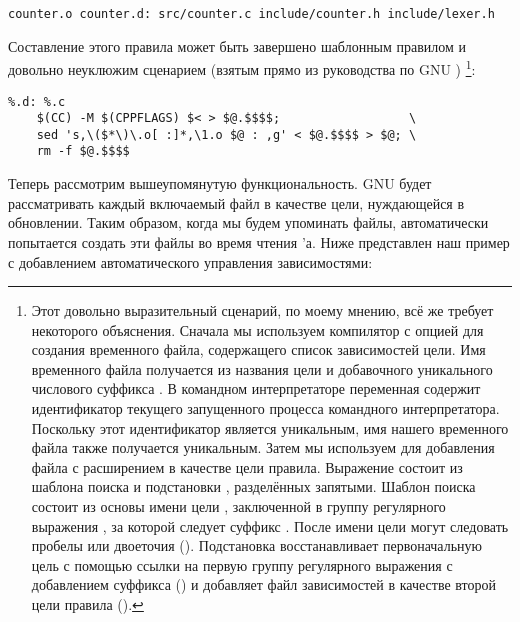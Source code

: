 {\footnotesize
\begin{verbatim}
counter.o counter.d: src/counter.c include/counter.h include/lexer.h
\end{verbatim}
}

Составление этого правила может быть завершено шаблонным правилом и
довольно неуклюжим сценарием (взятым прямо из руководства по GNU
\GNUmake{}) \footnote{Этот довольно выразительный сценарий, по моему
мнению, всё же требует некоторого объяснения. Сначала мы используем
компилятор \Clang{} с опцией  для создания временного
файла, содержащего список зависимостей цели. Имя временного файла
получается из названия цели  и добавочного уникального
числового суффикса . В командном
интерпретаторе  переменная \command{\${}\${}} содержит
идентификатор текущего запущенного процесса командного интерпретатора.
Поскольку этот идентификатор является уникальным, имя нашего
временного файла также получается уникальным.  Затем мы используем
 для добавления файла с расширением  в
качестве цели правила. Выражение  состоит из шаблона
поиска
 и подстановки , разделённых
запятыми. Шаблон поиска состоит из основы имени цели \command{\${}*},
заключенной в группу регулярного выражения
\command{\textbackslash{}(\textbackslash{})}, за которой следует
суффикс . После имени цели могут следовать пробелы или
двоеточия (\command{[ :]*}). Подстановка восстанавливает
первоначальную цель с помощью ссылки на первую группу регулярного
выражения с добавлением суффикса () и
добавляет файл зависимостей в качестве второй цели правила
().}:

{\footnotesize
\begin{verbatim}
%.d: %.c
    $(CC) -M $(CPPFLAGS) $< > $@.$$$$;                  \
    sed 's,\($*\)\.o[ :]*,\1.o $@ : ,g' < $@.$$$$ > $@; \
    rm -f $@.$$$$
\end{verbatim}
}

Теперь рассмотрим вышеупомянутую функциональность. GNU \GNUmake{}
будет рассматривать каждый включаемый файл в качестве цели,
нуждающейся в обновлении.  Таким образом, когда мы будем упоминать
\filename{.d} файлы, \GNUmake{} автоматически попытается создать эти
файлы во время чтения \Makefile{}'а. Ниже представлен наш пример с
добавлением автоматического управления зависимостями:

